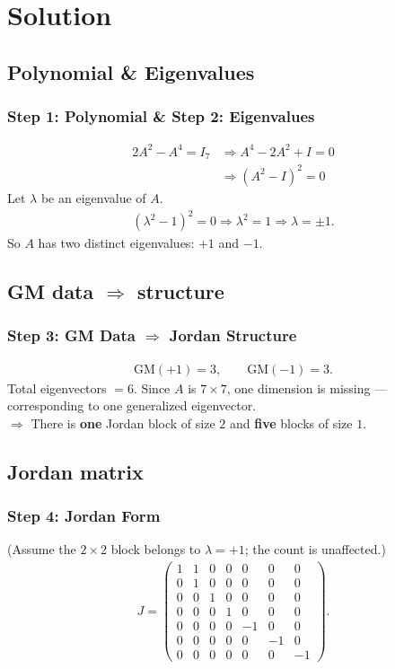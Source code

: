 \documentclass{beamer}
\newcommand{\myvec}[1]{\ensuremath{\begin{pmatrix}#1\end{pmatrix}}}
\numberwithin{equation}{section}
\begin{document}
\section{Solution}
\subsection{Polynomial \& Eigenvalues}
\begin{frame}
\frametitle{Step 1: Polynomial \& Step 2: Eigenvalues}
\begin{align}
2A^2 - A^4 = I_7
&\Rightarrow A^4 - 2A^2 + I = 0\\
&\Rightarrow (A^2 - I)^2 = 0
\end{align}
Let $\lambda$ be an eigenvalue of $A$.
\begin{align}
(\lambda^2 - 1)^2 = 0 \Rightarrow \lambda^2 = 1 \Rightarrow \lambda = \pm 1.
\end{align}
So $A$ has two distinct eigenvalues: $+1$ and $-1$.
\end{frame}

\subsection{GM data \texorpdfstring{$\Rightarrow$}{=>} structure}
\begin{frame}
\frametitle{Step 3: GM Data $\Rightarrow$ Jordan Structure}
\begin{align}
\text{GM}(+1)=3,\qquad \text{GM}(-1)=3.
\end{align}
Total eigenvectors $=6$. Since $A$ is $7\times7$, one dimension is missing — corresponding to one generalized eigenvector.\\[4pt]
$\Rightarrow$ There is \textbf{one} Jordan block of size $2$ and \textbf{five} blocks of size $1$.
\end{frame}

\subsection{Jordan matrix}
\begin{frame}
\frametitle{Step 4: Jordan Form}
(Assume the $2\times2$ block belongs to $\lambda=+1$; the count is unaffected.)
\begin{align}
J =
\myvec{
1 & 1 & 0 & 0 & 0 & 0 & 0\\
0 & 1 & 0 & 0 & 0 & 0 & 0\\
0 & 0 & 1 & 0 & 0 & 0 & 0\\
0 & 0 & 0 & 1 & 0 & 0 & 0\\
0 & 0 & 0 & 0 & -1 & 0 & 0\\
0 & 0 & 0 & 0 & 0 & -1 & 0\\
0 & 0 & 0 & 0 & 0 & 0 & -1
}.
\end{align}
\end{frame}
\end{document}
